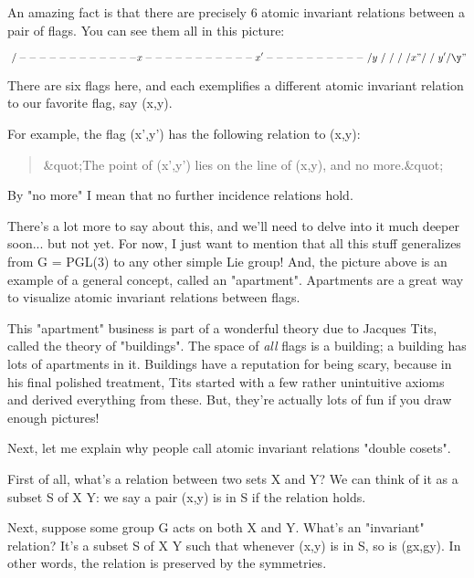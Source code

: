 An amazing fact is that there are precisely 6 atomic invariant relations 
between a pair of flags.  You can see them all in this picture:

$$
                 \             /
      ------------x-----------x'----------
                   \         /         y
                    \       /
                     \     /
                      \   /
                       \ /
                        x"
                       / \
                      /   \
                   y'/     \y"
$$
    
There are six flags here, and each exemplifies a different
atomic invariant relation to our favorite flag, say (x,y).

For example, the flag (x',y') has the following relation to (x,y):

\begin{quote}
   &quot;The point of (x',y') lies on the line of (x,y), and no more.&quot;
\end{quote}
    
By "no more" I mean that no further incidence relations hold.

There's a lot more to say about this, and we'll need to delve into
it much deeper soon... but not yet.  For now, I just want to mention 
that all this stuff generalizes from G = PGL(3) to any other simple 
Lie group!  And, the picture above is an example of a general concept, 
called an "apartment".  Apartments are a great way to visualize 
atomic invariant relations between flags.

This "apartment" business is part of a wonderful theory due
to Jacques Tits, called the theory of "buildings".  The
space of \emph{all} flags is a building; a building has lots of apartments
in it.  Buildings have a reputation for being scary, because in his
final polished treatment, Tits started with a few rather unintuitive
axioms and derived everything from these.  But, they're actually lots
of fun if you draw enough pictures!

Next, let me explain why people call atomic invariant relations
"double cosets".

First of all, what's a relation between two sets X and Y?  We can
think of it as a subset S of X \times  Y: we say a pair (x,y) is in S
if the relation holds.

Next, suppose some group G acts on both X and Y.  What's an
"invariant" relation?  It's a subset S of X \times  Y such
that whenever (x,y) is in S, so is (gx,gy).  In other words, the
relation is preserved by the symmetries.


